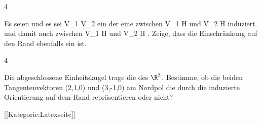 {4}
{

Es seien
und es sei
\maabbdisp {\varphi} {V_1 } { V_2
} {}
ein
der eine
zwischen
\mathkor {} {V_1 \cap H} {und} {V_2 \cap H} {}
induziert und damit auch zwischen
\mathkor {} {V_1 \cap \partial H} {und} {V_2 \cap \partial H} {}
 {} {.}
Zeige, dass die Einschränkung auf den Rand ebenfalls ein
ist.

}
{} {}

{4}
{

Die abgeschlossene Einheitskugel
 trage die
 des $\R^3$. Bestimme, ob die beiden Tangentenvektoren
\mathkor {} {(2,1,0)} {und} {(3,-1,0)} {}
am Nordpol
 die durch die
 induzierte Orientierung auf dem Rand
 {} {} repräsentieren oder nicht?

}
{} {}

 [[Kategorie:Latexseite]]

